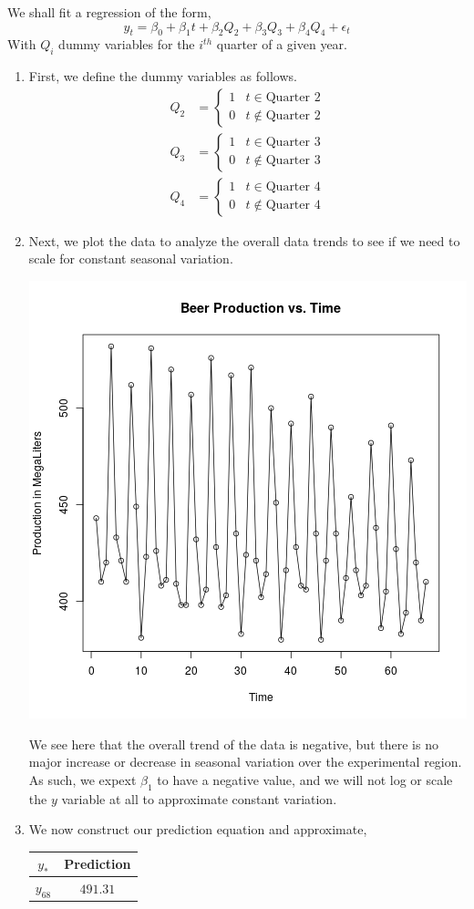 \documentclass[letterpaper,10pt]{article}
\begin{document}
We shall fit a regression of the form,
\[y_t=\beta_0+\beta_1 t+\beta_2 Q_2+\beta_3 Q_3+\beta_4 Q_4+\epsilon_t\]
With $Q_i$ dummy variables for the $i^{th}$ quarter of a given year. 
\begin{enumerate}
\item First, we define the dummy variables as follows.
\begin{align*}
Q_2 &= \begin{cases}
1 & t\in\text{Quarter 2}\\
0 & t\not\in\text{Quarter 2}
\end{cases}\\
Q_3 &= \begin{cases}
1 & t\in\text{Quarter 3}\\
0 & t\not\in\text{Quarter 3}
\end{cases}\\
Q_4 &= \begin{cases}
1 & t\in\text{Quarter 4}\\
0 & t\not\in\text{Quarter 4}
\end{cases}
\end{align*}
\item Next, we plot the data to analyze the overall data trends to see if we need to scale for constant seasonal variation.
\begin{center}
\includegraphics[scale=.8]{unlogged.png}
\end{center}
We see here that the overall trend of the data is negative, but there is no major increase or decrease in seasonal variation over the experimental region. As such, we expext $\beta_1$ to have a negative value, and we will not log or scale the $y$ variable at all to approximate constant variation.
\item We now construct our prediction equation and approximate,
\begin{tabular}{|c|c|}
\hline
$y_*$ & Prediction \\\hline
$y_{68}$ & $491.31$ \\


\end{tabular} 
\end{enumerate}
\end{document}

